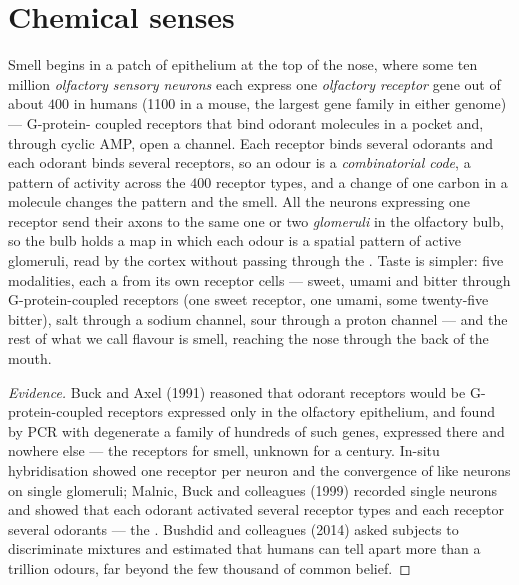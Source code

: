 \section{Chemical senses}

\begin{definition}\label{def:b3:sensory-systems:chemical}
Smell begins in a patch of epithelium at the top of the nose, where
some ten million \emph{olfactory sensory neurons} each express one
\emph{olfactory receptor} gene out of about $400$ in humans (\num{1100}
in a mouse, the largest gene family in either genome) --- G-protein-
coupled receptors that bind odorant molecules in a pocket and, through
cyclic AMP, open a channel. Each receptor binds several odorants and
each odorant binds several receptors, so an odour is a
\emph{combinatorial code}, a pattern of activity across the $400$
receptor types, and a change of one carbon in a molecule changes the
pattern and the smell. All the neurons expressing one receptor send
their axons to the same one or two \emph{glomeruli} in the olfactory
bulb, so the bulb holds a map in which each odour is a spatial
pattern of active glomeruli, read by the cortex without passing
through the . Taste is simpler: five modalities, each a
 from its own receptor cells --- sweet, umami and bitter
through G-protein-coupled receptors (one sweet receptor, one umami,
some twenty-five bitter), salt through a sodium channel, sour through
a proton channel --- and the rest of what we call flavour is smell,
reaching the nose through the back of the mouth.
\end{definition}

\begin{proof}[Evidence]
Buck and Axel (1991) reasoned that odorant receptors would be
G-protein-coupled receptors expressed only in the olfactory epithelium,
and found by PCR with degenerate  a family of hundreds of
such genes, expressed there and nowhere else --- the receptors for
smell, unknown for a century. In-situ hybridisation showed one receptor
per neuron and the convergence of like neurons on single glomeruli;
Malnic, Buck and colleagues (1999) recorded single neurons and showed
that each odorant activated several receptor types and each receptor
several odorants --- the . Bushdid and colleagues
(2014) asked subjects to discriminate mixtures and estimated that
humans can tell apart more than a trillion odours, far beyond the
few thousand of common belief.
\end{proof}

